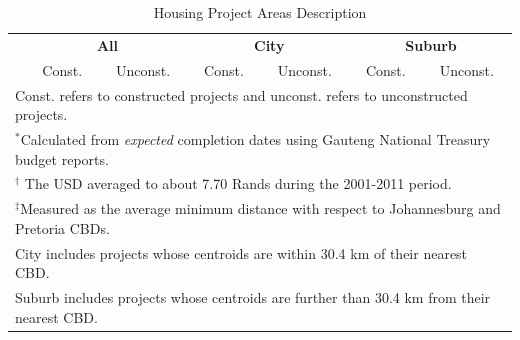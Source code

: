 \documentclass[12pt]{article}
\begin{document}
\vspace{0mm}
\begin{table}[h!]
\centering
\caption{Housing Project Areas Description}\label{table:projectdescriptives}
\vspace{0mm}
\begin{tabular}{l*{1}{cccccc}}
\toprule
  & \multicolumn{2}{c}{\textbf{All}}& \multicolumn{2}{c}{\textbf{City}}  & \multicolumn{2}{c}{\textbf{Suburb}}   \\
  &Const. & Unconst. &Const. & Unconst.   & Const. & Unconst. \\
\midrule

\bottomrule
\multicolumn{7}{l}{\scriptsize Const. refers to constructed projects and unconst. refers to unconstructed projects.}\\[-.5em]
\multicolumn{7}{l}{\scriptsize $^*$Calculated from {\it expected} completion dates using Gauteng National Treasury budget reports.}\\[-.5em]
\multicolumn{7}{l}{\scriptsize $^\dagger$ The USD averaged to about 7.70 Rands during the 2001-2011 period.}\\[-.5em]
\multicolumn{7}{l}{\scriptsize $^\ddagger$Measured as the average minimum distance with respect to Johannesburg and Pretoria CBDs. } \\[-.5em]
\multicolumn{7}{l}{\scriptsize City includes projects whose centroids are within 30.4 km of their nearest CBD.} \\[-.5em]
\multicolumn{7}{l}{\scriptsize Suburb includes projects whose centroids are further than 30.4 km from their nearest CBD.}
\end{tabular}
\end{table} 
\end{document}
